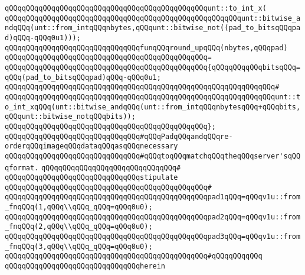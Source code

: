 \verb|qQQqqQQqqQQqqQQqqQQqqQQqqQQqqQQqqQQqqQQqqQQqqQQqunt::to_int_x(|\newline
\verb|qQQqqQQqqQQqqQQqqQQqqQQqqQQqqQQqqQQqqQQqqQQqqQQqqQQqqQQqunt::bitwise_andqQQq(unt::from_intqQQqnbytes,qQQqunt::bitwise_not((pad_to_bitsqQQqpad)qQQq-qQQq0u1)));|\newline
\newline
\verb|qQQqqQQqqQQqqQQqqQQqqQQqqQQqqQQqfunqQQqround_upqQQq(nbytes,qQQqpad)|\newline
\verb|qQQqqQQqqQQqqQQqqQQqqQQqqQQqqQQqqQQqqQQqqQQqqQQq=|\newline
\verb|qQQqqQQqqQQqqQQqqQQqqQQqqQQqqQQqqQQqqQQqqQQqqQQq{qQQqqQQqqQQqbitsqQQq=qQQq(pad_to_bitsqQQqpad)qQQq-qQQq0u1;|\newline
\verb|qQQqqQQqqQQqqQQqqQQqqQQqqQQqqQQqqQQqqQQqqQQqqQQqqQQqqQQqqQQqqQQq#|\newline
\verb|qQQqqQQqqQQqqQQqqQQqqQQqqQQqqQQqqQQqqQQqqQQqqQQqqQQqqQQqqQQqqQQqunt::to_int_xqQQq(unt::bitwise_andqQQq(unt::from_intqQQqnbytesqQQq+qQQqbits,qQQqunt::bitwise_notqQQqbits));|\newline
\verb|qQQqqQQqqQQqqQQqqQQqqQQqqQQqqQQqqQQqqQQqqQQqqQQq};|\newline
\newline
\verb|qQQqqQQqqQQqqQQqqQQqqQQqqQQqqQQq#qQQqPadqQQqandqQQqre-orderqQQqimageqQQqdataqQQqasqQQqnecessary|\newline
\verb|qQQqqQQqqQQqqQQqqQQqqQQqqQQqqQQq#qQQqtoqQQqmatchqQQqtheqQQqserver'sqQQqformat.|\newline
\verb|qQQqqQQqqQQqqQQqqQQqqQQqqQQqqQQq#|\newline
\verb|qQQqqQQqqQQqqQQqqQQqqQQqqQQqqQQqstipulate|\newline
\verb|qQQqqQQqqQQqqQQqqQQqqQQqqQQqqQQqqQQqqQQqqQQqqQQq#|\newline
\verb|qQQqqQQqqQQqqQQqqQQqqQQqqQQqqQQqqQQqqQQqqQQqqQQqpad1qQQq=qQQqv1u::from_fnqQQq(1,qQQq\\qQQq_qQQq=qQQq0u0);|\newline
\verb|qQQqqQQqqQQqqQQqqQQqqQQqqQQqqQQqqQQqqQQqqQQqqQQqpad2qQQq=qQQqv1u::from_fnqQQq(2,qQQq\\qQQq_qQQq=qQQq0u0);|\newline
\verb|qQQqqQQqqQQqqQQqqQQqqQQqqQQqqQQqqQQqqQQqqQQqqQQqpad3qQQq=qQQqv1u::from_fnqQQq(3,qQQq\\qQQq_qQQq=qQQq0u0);|\newline
\verb|qQQqqQQqqQQqqQQqqQQqqQQqqQQqqQQqqQQqqQQqqQQqqQQq#qQQqqQQqqQQq|\newline
\verb|qQQqqQQqqQQqqQQqqQQqqQQqqQQqqQQqherein|\newline
